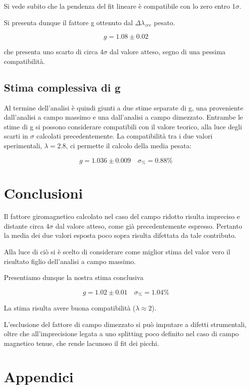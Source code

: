 \documentclass{article}
\begin{document}
	Si vede subito che la pendenza del fit lineare è compatibile con lo zero entro 1$\sigma$.

	Si presenta dunque il fattore g ottenuto dal $\Delta\lambda_{zee}$ pesato.

	\[
		g = 1.08 \pm 0.02	
	\]
	
	che presenta uno scarto di circa 4$\sigma$ dal valore atteso, segno di una pessima compatibilità.

	\subsection*{Stima complessiva di g}

	Al termine dell'analisi è quindi giunti a due stime separate di g, una proveniente dall'analisi 
	a campo massimo e una dall'analisi a campo dimezzato. Entrambe le stime di g si possono considerare
	compatibili con il valore teorico, alla luce degli scarti in $\sigma$ calcolati precedentemente. 
	La compatibilità tra i due valori sperimentali, $\lambda = 2.8$, ci permette il calcolo della media
	pesata:

	\[
		g = 1.036 \pm 0.009	\quad \sigma_{\%} = 0.88 \%
	\]



	\section*{Conclusioni}

	Il fattore giromagnetico calcolato nel caso del campo ridotto risulta impreciso e distante
	circa 4$\sigma$ dal valore atteso, come già precedentemente espresso. Pertanto la media dei due valori
	esposta poco sopra risulta difettata da tale contributo. 
	
	Alla luce di ciò si è scelto di considerare come miglior stima del valor vero il risultato figlio
	dell'analisi a campo massimo.

	Presentiamo dunque la nostra stima conclusiva

	\[
		g = 1.02 \pm 0.01	\quad \sigma_{\%} = 1.04\%
	\]

	La stima risulta avere buona compatibilità ($\lambda \approx 2$).

	L'esclusione del fattore di campo dimezzato si può imputare a difetti strumentali, oltre che
	all'imprecisione legata a uno splitting poco definito nel caso di campo magnetico tenue, che rende 
	lacunoso il fit dei picchi.
  

	\newpage
	\appendix
	\section{Appendici}
	\label{appendice}
\end{document}
